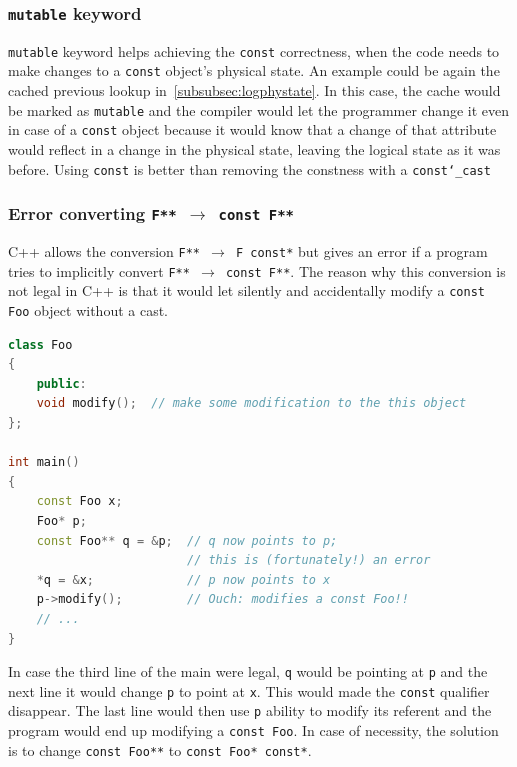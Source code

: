 \subsubsection{\texttt{mutable} keyword}
\texttt{mutable} keyword helps achieving the \texttt{const} correctness, 
when the code needs to make changes to a \texttt{const} object's 
physical state. An example could be again the cached previous lookup
in~\ref{subsubsec:logphystate}. In this case, the cache would be marked as 
\texttt{mutable} and the compiler would let the programmer change it 
even in case of a \texttt{const} object because it would know that 
a change of that attribute would reflect in a change in the physical 
state, leaving the logical state as it was before.
\newline
Using \texttt{const} is better than removing the constness with a 
\texttt{const\char`_cast}

\subsubsection{Error converting \quad \texttt{F** $\rightarrow$ const F**}}
\label{subsubsec:error-converting}
C++ allows the conversion \texttt{F** $\rightarrow$ F const*} but gives 
an error if a program tries to implicitly convert 
\texttt{F** $\rightarrow$ const F**}.
\newline
The reason why this conversion is not legal in C++ is that it would let 
silently and accidentally modify a \texttt{const Foo} object without a 
cast.
\begin{lstlisting}[language=C++]
class Foo
{
    public:
    void modify();  // make some modification to the this object
};

int main()
{
    const Foo x;
    Foo* p;
    const Foo** q = &p;  // q now points to p;
                         // this is (fortunately!) an error
    *q = &x;             // p now points to x
    p->modify();         // Ouch: modifies a const Foo!!
    // ...
}
\end{lstlisting}
In case the third line of the main were legal, \texttt{q} would be 
pointing at \texttt{p} and the next line it would change \texttt{p} to 
point at \texttt{x}. This would made the \texttt{const} qualifier 
disappear. The last line would then use \texttt{p} ability to modify 
its referent and the program would end up modifying a 
\texttt{const Foo}.
\newline
In case of necessity, the solution is to change \texttt{const Foo**} to 
\texttt{const Foo* const*}.

